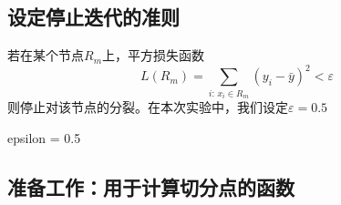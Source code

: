 \documentclass[
]{ctexart}
\newenvironment{Shaded}{\begin{snugshade}}{\end{snugshade}}
\newcommand{\FloatTok}[1]{\textcolor[rgb]{0.00,0.00,0.81}{#1}}
\newcommand{\NormalTok}[1]{#1}
\newcommand{\OtherTok}[1]{\textcolor[rgb]{0.56,0.35,0.01}{#1}}
\begin{document}
\hypertarget{ux8bbeux5b9aux505cux6b62ux8fedux4ee3ux7684ux51c6ux5219}{%
\subsection{设定停止迭代的准则}\label{ux8bbeux5b9aux505cux6b62ux8fedux4ee3ux7684ux51c6ux5219}}

若在某个节点\(R_m\)上，平方损失函数
\[L(R_m)=\sum_{i:\, x_i\in R_m}(y_i-\bar{y})^2 <\varepsilon\]
则停止对该节点的分裂。在本次实验中，我们设定\(\varepsilon=0.5\)

\begin{Shaded}
\begin{Highlighting}[]
\NormalTok{epsilon }\OtherTok{=} \FloatTok{0.5}
\end{Highlighting}
\end{Shaded}

\hypertarget{ux51c6ux5907ux5de5ux4f5cux7528ux4e8eux8ba1ux7b97ux5207ux5206ux70b9ux7684ux51fdux6570}{%
\subsection{准备工作：用于计算切分点的函数}\label{ux51c6ux5907ux5de5ux4f5cux7528ux4e8eux8ba1ux7b97ux5207ux5206ux70b9ux7684ux51fdux6570}}
\end{document}
